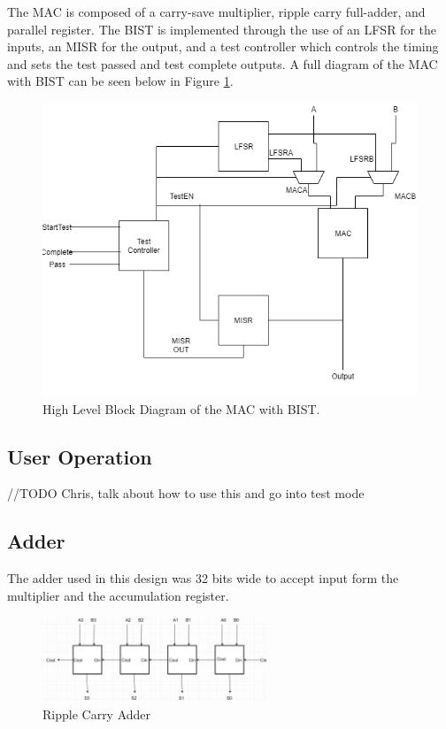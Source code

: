 \documentclass[11pt]{article}
\begin{document}
	The MAC is composed of a carry-save multiplier, ripple carry full-adder, and parallel register. The BIST is implemented through the use of an LFSR for the inputs, an MISR for the output, and a test controller which controls the timing and sets the test passed and test complete outputs. A full diagram of the MAC with BIST can be seen below in Figure \ref{fig:full-project-block}.
	
	\begin{figure}[H]
		\centering
		\includegraphics[width=0.7\linewidth]{Pictures/Full-Project-Block}
		\caption{High Level Block Diagram of the MAC with BIST.}
		\label{fig:full-project-block}
	\end{figure}


	\subsection{User Operation}
		//TODO Chris, talk about how to use this and go into test mode
	

	\subsection{Adder}
	
		The adder used in this design was 32 bits wide to accept input form the multiplier and the accumulation register. 
		
		\begin{figure}[H]
			\centering
			\includegraphics[width=0.6\textwidth,height=\dimexpr\textheight-4\baselineskip-\abovecaptionskip-\belowcaptionskip\relax,keepaspectratio]{"Pictures/Ripple Carry Adder"}
			\caption{Ripple Carry Adder}
			\label{fig:ripple-carry-adder}
		\end{figure}
	
\end{document}
